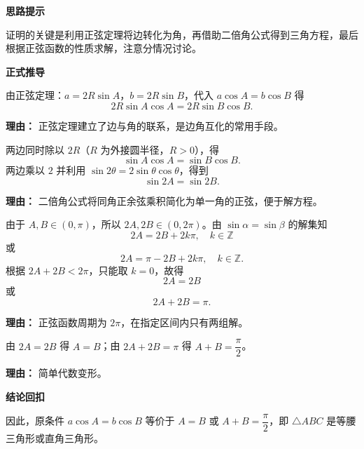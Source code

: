 \begin{proofbox}
	\textbf{\textcolor{CProof}{思路提示}}

	证明的关键是利用正弦定理将边转化为角，再借助二倍角公式得到三角方程，最后根据正弦函数的性质求解，注意分情况讨论。

	\medskip
	\textbf{\textcolor{CProof}{正式推导}}
	\begin{description}[style=nextline, leftmargin=2.8em, labelsep=0.5em, itemsep=0.55em]
		\item[\textbf{步骤一（边化角）：}] 由正弦定理：$a = 2R\sin A$，$b = 2R\sin B$，代入 $a\cos A = b\cos B$ 得
			\[
				2R\sin A\cos A = 2R\sin B\cos B.
			\]
			\par\textbf{理由：} 正弦定理建立了边与角的联系，是边角互化的常用手段。

		\item[\textbf{步骤二（约简与倍角）：}] 两边同时除以 $2R$（$R$ 为外接圆半径，$R>0$），得
			\[
				\sin A\cos A = \sin B\cos B.
			\]
			两边乘以 $2$ 并利用 $\sin 2\theta = 2\sin\theta\cos\theta$，得到
			\[
				\sin 2A = \sin 2B.
			\]
			\par\textbf{理由：} 二倍角公式将同角正余弦乘积简化为单一角的正弦，便于解方程。

		\item[\textbf{步骤三（解三角方程）：}] 由于 $A,B\in(0,\pi)$，所以 $2A,2B\in(0,2\pi)$。由 $\sin\alpha = \sin\beta$ 的解集知
			\[
				2A = 2B + 2k\pi,\quad k\in\mathbb{Z}
			\]
			或
			\[
				2A = \pi - 2B + 2k\pi,\quad k\in\mathbb{Z}.
			\]
			根据 $2A+2B<2\pi$，只能取 $k=0$，故得
			\[
				2A = 2B
			\]
			或
			\[
				2A + 2B = \pi.
			\]
			\par\textbf{理由：} 正弦函数周期为 $2\pi$，在指定区间内只有两组解。

		\item[\textbf{步骤四（化简要结论）：}] 由 $2A = 2B$ 得 $A = B$；由 $2A + 2B = \pi$ 得 $A + B = \dfrac{\pi}{2}$。
			\par\textbf{理由：} 简单代数变形。
	\end{description}

	\medskip
	\textbf{\textcolor{CProof}{结论回扣}}

	因此，原条件 $a\cos A = b\cos B$ 等价于 $A = B$ 或 $A + B = \dfrac{\pi}{2}$，即 $\triangle ABC$ 是等腰三角形或直角三角形。
\end{proofbox}
